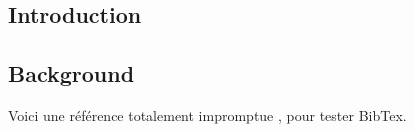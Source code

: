 \documentclass[10pt,a4paper]{article}
\begin{document}
\begin{multicols}{2}


\section{Introduction}

\subsection{Background}

Voici une référence totalement impromptue \cite{knuth74}, pour tester BibTex.

\blinddocument


\end{multicols}

\renewcommand*{\bibfont}{\footnotesize}
\printbibliography
\end{document}
